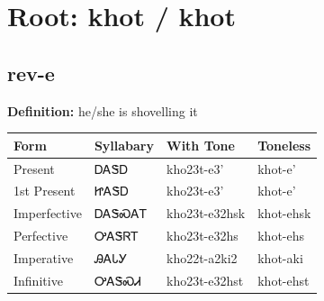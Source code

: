 \documentclass{article}%
\begin{document}
%
\normalsize%
\section*{Root: khot / khot}%
\subsection*{rev-e}%
\textbf{Definition: }%
he/she is shovelling it%
\\[0.5em]%
\begin{tabular}{|l|l|l|l|}%
\hline%
\textbf{Form}&\textbf{Syllabary}&\textbf{With Tone}&\textbf{Toneless}\\%
\hline%
Present&ᎠᎪᏕᎠ&kho23t{-}e3'&khot{-}e'\\%
1st Present&ᏥᎪᏕᎠ&kho23t{-}e3'&khot{-}e'\\%
Imperfective&ᎠᎪᏕᏍᎪᎢ&kho23t{-}e32hsk&khot{-}ehsk\\%
Perfective&ᎤᎪᏕᏒᎢ&kho23t{-}e32hs&khot{-}ehs\\%
Imperative&ᎯᎪᏓᎩ&kho22t{-}a2ki2&khot{-}aki\\%
Infinitive&ᎤᎪᏕᏍᏗ&kho23t{-}e32hst&khot{-}ehst\\%
\hline%
\end{tabular}%
\\[1em]%
\end{document}
